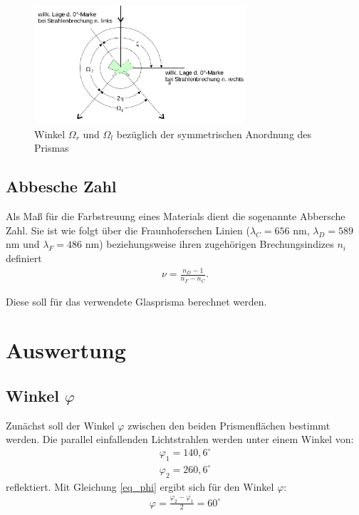 \begin{figure}[H]
\includegraphics[width=0.7\textwidth]{pics/prisma_ohm1.png}
\caption{Winkel $\Omega_r$ und $\Omega_l$ bezüglich der symmetrischen Anordnung des Prismas}
\label{pic:prisma_ohmlr}
\end{figure}
	
\subsection{Abbesche Zahl}
	Als Maß für die Farbstreuung eines Materials dient die sogenannte Abbersche Zahl. Sie ist wie folgt über die Fraunhoferschen Linien ($\lambda_C = 656$ nm, $\lambda_D = 589$ nm und $\lambda_F = 486$ nm) beziehungsweise ihren zugehörigen Brechungsindizes $n_i$ definiert
\begin{align}
\nu = \frac{n_D -1 }{n_F - n_C}.
\label{eq_abbe}
\end{align}

Diese soll für das verwendete Glasprisma berechnet werden.

\section{Auswertung}
\subsection{Winkel $\varphi$}
Zunächst soll der Winkel $\varphi$ zwischen den beiden Prismenflächen bestimmt werden. Die parallel einfallenden Lichtstrahlen werden unter einem Winkel von:
\begin{align*}
\varphi_1=140,6^\circ\\
\varphi_2=260,6^\circ
\end{align*}
reflektiert. Mit Gleichung \eqref{eq_phi} ergibt sich für den Winkel $\varphi$:
\begin{align*}
\varphi = \frac{\varphi_2-\varphi_1}{2}=60^\circ
\end{align*}
